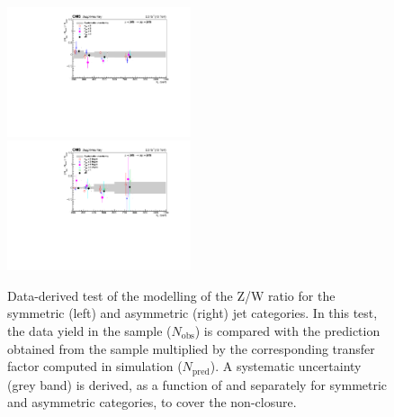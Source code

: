 \begin{figure}[tbhp]
    \caption{ 
  Data-derived test of the modelling of the Z/W ratio for the symmetric (left) and asymmetric (right) jet categories. 
  In this test, the data yield in the \mmj sample ($N_{\mathrm{obs}}$) 
  is compared with the prediction obtained from the \mj sample multiplied by the corresponding 
  transfer factor computed in simulation ($N_{\mathrm{pred}}$). 
  A systematic uncertainty (grey band) is derived, as a function of \scalht and separately for symmetric and asymmetric categories, 
  to cover the non-closure. 
    \label{fig:CT-alphaT} }
  \begin{center}
     \includegraphics[width=0.48\textwidth]{figures/mu_mumusym_half_noFit} ~~
     \includegraphics[width=0.48\textwidth]{figures/mu_mumuasym_half_noFit}
  \end{center}
\end{figure}





